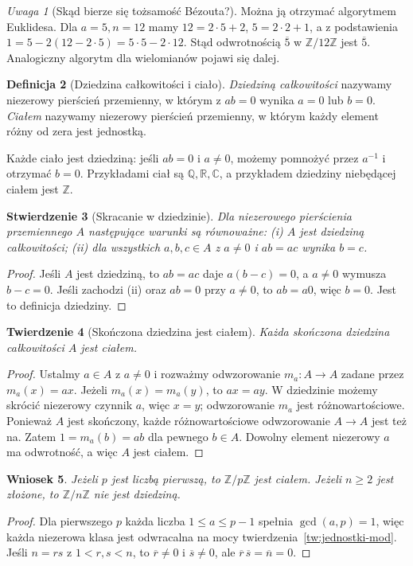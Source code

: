 \documentclass[11pt,a4paper,openany]{report}
\numberwithin{equation}{section}
\theoremstyle{plain}
\newtheorem{twierdzenie}{Twierdzenie}[section]
\newtheorem{wniosek}[twierdzenie]{Wniosek}
\newtheorem{stwierdzenie}[twierdzenie]{Stwierdzenie}
\theoremstyle{definition}
\newtheorem{definicja}[twierdzenie]{Definicja}
\theoremstyle{remark}
\newtheorem{uwaga}[twierdzenie]{Uwaga}
\newcommand{\Z}{\mathbb Z}
\newcommand{\Q}{\mathbb Q}
\newcommand{\R}{\mathbb R}
\newcommand{\C}{\mathbb C}
\begin{document}
\begin{uwaga}[Skąd bierze się tożsamość Bézouta?]
Można ją otrzymać algorytmem Euklidesa. Dla $a=5,n=12$ mamy
$12=2\cdot5+2$, $5=2\cdot2+1$, a z podstawienia
$1=5-2(12-2\cdot5)=5\cdot5-2\cdot12$.
Stąd odwrotnością $\overline5$ w $\Z/12\Z$ jest $\overline5$.
Analogiczny algorytm dla wielomianów pojawi się dalej.
\end{uwaga}

\begin{definicja}[Dziedzina całkowitości i ciało]
\label{def:dziedzina-cialo}
\emph{Dziedziną całkowitości} nazywamy niezerowy pierścień przemienny,
w którym z $ab=0$ wynika $a=0$ lub $b=0$.
\emph{Ciałem} nazywamy niezerowy pierścień przemienny,
w którym każdy element różny od zera jest jednostką.
\end{definicja}

Każde ciało jest dziedziną: jeśli $ab=0$ i $a\ne0$, możemy pomnożyć
przez $a^{-1}$ i otrzymać $b=0$. Przykładami ciał są $\Q,\R,\C$,
a przykładem dziedziny niebędącej ciałem jest $\Z$.

\begin{stwierdzenie}[Skracanie w dziedzinie]
Dla niezerowego pierścienia przemiennego $A$ następujące warunki są
równoważne: (i) $A$ jest dziedziną całkowitości;
(ii) dla wszystkich $a,b,c\in A$ z $a\ne0$ i $ab=ac$ wynika $b=c$.
\end{stwierdzenie}
\begin{proof}
Jeśli $A$ jest dziedziną, to $ab=ac$ daje $a(b-c)=0$,
a $a\ne0$ wymusza $b-c=0$. Jeśli zachodzi (ii) oraz $ab=0$ przy $a\ne0$,
to $ab=a0$, więc $b=0$. Jest to definicja dziedziny.
\end{proof}

\begin{twierdzenie}[Skończona dziedzina jest ciałem]
\label{tw:skonczona}
Każda skończona dziedzina całkowitości $A$ jest ciałem.
\end{twierdzenie}
\begin{proof}
Ustalmy $a\in A$ z $a\ne0$ i rozważmy odwzorowanie
$m_a\colon A\to A$ zadane przez $m_a(x)=ax$.
Jeżeli $m_a(x)=m_a(y)$, to $ax=ay$. W dziedzinie możemy skrócić
niezerowy czynnik $a$, więc $x=y$; odwzorowanie $m_a$ jest różnowartościowe.
Ponieważ $A$ jest skończony, każde różnowartościowe odwzorowanie $A\to A$
jest też na. Zatem $1=m_a(b)=ab$ dla pewnego $b\in A$.
Dowolny element niezerowy $a$ ma odwrotność, a więc $A$ jest ciałem.
\end{proof}

\begin{wniosek}
Jeżeli $p$ jest liczbą pierwszą, to $\Z/p\Z$ jest ciałem.
Jeżeli $n\ge2$ jest złożone, to $\Z/n\Z$ nie jest dziedziną.
\end{wniosek}
\begin{proof}
Dla pierwszego $p$ każda liczba $1\le a\le p-1$ spełnia
$\gcd(a,p)=1$, więc każda niezerowa klasa jest odwracalna
na mocy twierdzenia~\ref{tw:jednostki-mod}.
Jeśli $n=rs$ z $1<r,s<n$, to
$\overline r\ne0$ i $\overline s\ne0$, ale
$\overline r\,\overline s=\overline n=0$.
\end{proof}
\end{document}
